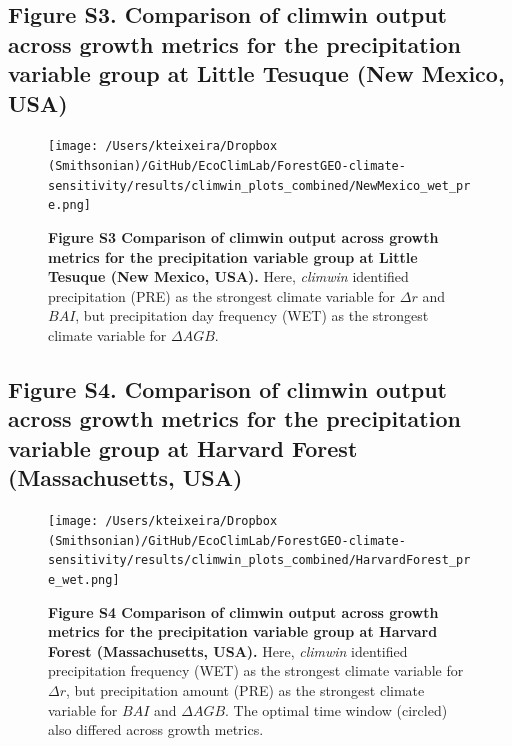 \documentclass[
]{article}
\begin{document}
\newpage

\hypertarget{figure-s3.-comparison-of-climwin-output-across-growth-metrics-for-the-precipitation-variable-group-at-little-tesuque-new-mexico-usa}{%
\subsection{Figure S3. Comparison of climwin output across growth
metrics for the precipitation variable group at Little Tesuque (New
Mexico,
USA)}\label{figure-s3.-comparison-of-climwin-output-across-growth-metrics-for-the-precipitation-variable-group-at-little-tesuque-new-mexico-usa}}

\begin{figure}
\centering
\texttt{[image: /Users/kteixeira/Dropbox (Smithsonian)/GitHub/EcoClimLab/ForestGEO-climate-sensitivity/results/climwin\_plots\_combined/NewMexico\_wet\_pre.png]}
\caption{\textbf{Figure S3 \textbar{} Comparison of climwin output
across growth metrics for the precipitation variable group at Little
Tesuque (New Mexico, USA).} Here, \emph{climwin} identified
precipitation (PRE) as the strongest climate variable for \(\Delta r\)
and \(BAI\), but precipitation day frequency (WET) as the strongest
climate variable for \(\Delta AGB\).}
\end{figure}

\newpage

\hypertarget{figure-s4.-comparison-of-climwin-output-across-growth-metrics-for-the-precipitation-variable-group-at-harvard-forest-massachusetts-usa}{%
\subsection{Figure S4. Comparison of climwin output across growth
metrics for the precipitation variable group at Harvard Forest
(Massachusetts,
USA)}\label{figure-s4.-comparison-of-climwin-output-across-growth-metrics-for-the-precipitation-variable-group-at-harvard-forest-massachusetts-usa}}

\begin{figure}
\centering
\texttt{[image: /Users/kteixeira/Dropbox (Smithsonian)/GitHub/EcoClimLab/ForestGEO-climate-sensitivity/results/climwin\_plots\_combined/HarvardForest\_pre\_wet.png]}
\caption{\textbf{Figure S4 \textbar{} Comparison of climwin output
across growth metrics for the precipitation variable group at Harvard
Forest (Massachusetts, USA).} Here, \emph{climwin} identified
precipitation frequency (WET) as the strongest climate variable for
\(\Delta r\), but precipitation amount (PRE) as the strongest climate
variable for \(BAI\) and \(\Delta AGB\). The optimal time window
(circled) also differed across growth metrics.}
\end{figure}
\end{document}
